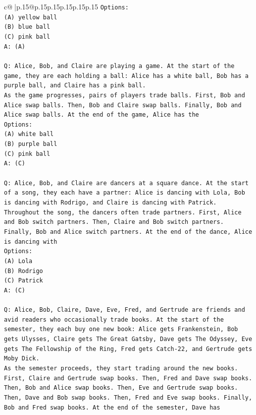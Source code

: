 \documentclass{article}
\begin{document}
{\begin{supertabular}{c@{$\;$}|p{.15\linewidth}@{}p{.15\linewidth}p{.15\linewidth}p{.15\linewidth}p{.15\linewidth}p{.15\linewidth}}
{{{\texttt{Options:} \\
\texttt{(A) yellow ball} \\
\texttt{(B) blue ball} \\
\texttt{(C) pink ball} \\
\texttt{A: (A)} \\
\\ 
\texttt{Q: Alice, Bob, and Claire are playing a game. At the start of the game, they are each holding a ball: Alice has a white ball, Bob has a purple ball, and Claire has a pink ball.} \\
\texttt{As the game progresses, pairs of players trade balls. First, Bob and Alice swap balls. Then, Bob and Claire swap balls. Finally, Bob and Alice swap balls. At the end of the game, Alice has the} \\
\texttt{Options:} \\
\texttt{(A) white ball} \\
\texttt{(B) purple ball} \\
\texttt{(C) pink ball} \\
\texttt{A: (C)} \\
\\ 
\texttt{Q: Alice, Bob, and Claire are dancers at a square dance. At the start of a song, they each have a partner: Alice is dancing with Lola, Bob is dancing with Rodrigo, and Claire is dancing with Patrick.} \\
\texttt{Throughout the song, the dancers often trade partners. First, Alice and Bob switch partners. Then, Claire and Bob switch partners. Finally, Bob and Alice switch partners. At the end of the dance, Alice is dancing with} \\
\texttt{Options:} \\
\texttt{(A) Lola} \\
\texttt{(B) Rodrigo} \\
\texttt{(C) Patrick} \\
\texttt{A: (C)} \\
\\ 
\texttt{Q: Alice, Bob, Claire, Dave, Eve, Fred, and Gertrude are friends and avid readers who occasionally trade books. At the start of the semester, they each buy one new book: Alice gets Frankenstein, Bob gets Ulysses, Claire gets The Great Gatsby, Dave gets The Odyssey, Eve gets The Fellowship of the Ring, Fred gets Catch{-}22, and Gertrude gets Moby Dick.} \\
\texttt{As the semester proceeds, they start trading around the new books. First, Claire and Gertrude swap books. Then, Fred and Dave swap books. Then, Bob and Alice swap books. Then, Eve and Gertrude swap books. Then, Dave and Bob swap books. Then, Fred and Eve swap books. Finally, Bob and Fred swap books. At the end of the semester, Dave has} \\
}}}
\end{supertabular}}
\end{document}
